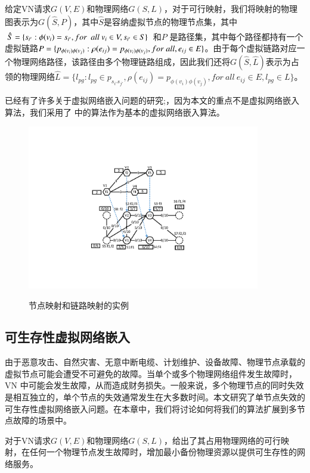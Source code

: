 给定VN请求$G(V,E)$和物理网络$G(S,L)$，对于可行映射，我们将映射的物理图表示为$G\left( {\hat S,P} \right)$，其中$\hat S$是容纳虚拟节点的物理节点集，其中$\hat S = \{ {s_{i'}}:\phi({v_i}) = {s_{i'}},for\ \ {\rm{ }}all\ {v_i} \in V,{s_{i'}} \in S\}$ 和$P$ 是路径集，其中每个路径都持有一个虚拟链路$P = \{ p_{\phi({v_i}) \phi({v_j})}:\rho(e_{ij}) = p_{\phi({v_i}) \phi({v_j})}{\rm{ }}, for\ all,{e_{ij}} \in E\}$。由于每个虚拟链路对应一个物理网络路径，该路径由多个物理链路组成，因此我们还将$G\left( {\hat S,\hat L} \right)$表示为占领的物理网络$\hat L = \{ {l_{pg}}:{l_{pg}} \in {p_{s_{i'}s_{j'}}}, \rho(e_{ij}) = p_{\phi({v_i}) \phi({v_j})},for\ all\ {e_{ij}} \in E,{l_{pg}} \in L\}$。

已经有了许多关于虚拟网络嵌入问题\cite{fischer2013virtual}的研究;，因为本文的重点不是虚拟网络嵌入算法，我们采用了\cite{lischka2009virtual} 中的算法作为基本的虚拟网络嵌入算法。


\begin{figure}[htbp]
\centering
\includegraphics[width=4in]{figures/VirtualNetworkEmbedding}\\
\caption{节点映射和链路映射的实例}\label{fig:VirtualNetworkEmbedding}
\end{figure}
\subsection{可生存性虚拟网络嵌入}
由于恶意攻击、自然灾害、无意中断电缆、计划维护、设备故障、物理节点承载的虚拟节点可能会遭受不可避免的故障。当单个或多个物理网络组件发生故障时，VN 中可能会发生故障，从而造成财务损失。一般来说，多个物理节点的同时失效是相互独立的，单个节点的失效通常发生在大多数时间\cite{yeow2010designing}。本文研究了单节点失效的可生存性虚拟网络嵌入问题。在本章中，我们将讨论如何将我们的算法扩展到多节点故障的场景中。

对于VN请求$G (V,E)$和物理网络$G (S,L)$，给出了其占用物理网络的可行映射，在任何一个物理节点发生故障时，增加最小备份物理资源以提供可生存性的网络服务。

